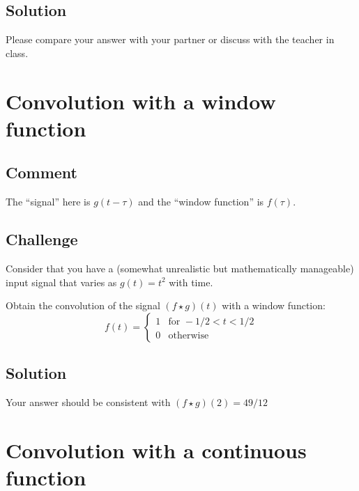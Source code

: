 \subsection*{Solution}
Please compare your answer with your partner or discuss with the teacher in class.




\newpage
\section{Convolution with a window function}

\subsection*{Comment}
The ``signal'' here is $g(t-\tau)$ and the ``window function'' is $f(\tau)$.

\subsection*{Challenge}
Consider that you have a (somewhat unrealistic but mathematically manageable) input signal that varies as $g(t)=t^2$ with time. 

Obtain the convolution of the signal $(f \star g)(t)$ with a window function:
\begin{equation}
    f(t)=
    \begin{cases}
        1 & \text{for } -1/2 < t < 1/2\\
        0 & \text{otherwise}
    \end{cases}
\end{equation}


\subsection*{Solution}
Your answer should be consistent with $(f \star g)(2) = 49/12$




\newpage
\section{Convolution with a continuous function}

